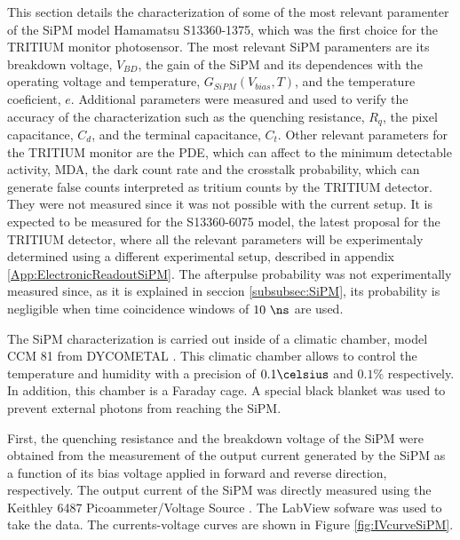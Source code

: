 This section details the characterization of some of the most relevant paramenter of the SiPM model Hamamatsu S13360-1375, which was the first choice for the TRITIUM monitor photosensor. The most relevant SiPM paramenters are its breakdown voltage, $V_{BD}$, the gain of the SiPM and its dependences with the operating voltage and temperature, $G_{SiPM}(V_{bias}, T)$, and the temperature coeficient, $e$. Additional parameters were measured and used to verify the accuracy of the characterization such as the quenching resistance, $R_q$, the pixel capacitance, $C_d$, and the terminal capacitance, $C_t$. Other relevant parameters for the TRITIUM monitor are the PDE, which can affect to the minimum detectable activity, MDA, the dark count rate and the crosstalk probability, which can generate false counts interpreted as tritium counts by the TRITIUM detector. They were not measured since it was not possible with the current setup. It is expected to be measured for the S13360-6075 model, the latest proposal for the TRITIUM detector, where all the relevant parameters will be experimentaly determined using a different experimental setup, described in appendix \ref{App:ElectronicReadoutSiPM}. The afterpulse probability was not experimentally measured since, as it is explained in seccion \ref{subsubsec:SiPM}, its probability is negligible when time coincidence windows of $10~\ns$ are used.

The SiPM characterization is carried out inside of a climatic chamber, model CCM 81 from DYCOMETAL \cite{ClimaticChamberIFIMED}. This climatic chamber allows to control the temperature and humidity with a precision of $0.1\celsius$ and $0.1\%$ respectively. In addition, this chamber is a Faraday cage. A special black blanket \cite{BlackBlancket} was used to prevent external photons from reaching the SiPM.

First, the quenching resistance and the breakdown voltage of the SiPM were obtained from the measurement of the output current generated by the SiPM as a function of its bias voltage applied in forward and reverse direction, respectively. The output current of the SiPM was directly measured using the Keithley 6487 Picoammeter/Voltage Source \cite{DataSheetKeithley6487}. The LabView sofware was used to take the data. The currents-voltage curves are shown in Figure \ref{fig:IVcurveSiPM}.

